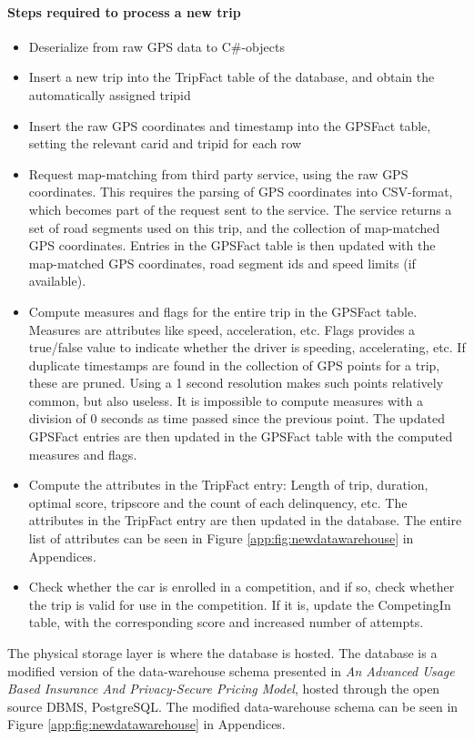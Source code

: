 \paragraph{Steps required to process a new trip}
\begin{itemize}
\item Deserialize from raw GPS data to C\#-objects
\item Insert a new trip into the TripFact table of the database, and obtain the automatically assigned tripid
\item Insert the raw GPS coordinates and timestamp into the GPSFact table, setting the relevant carid and tripid for each row
\item Request map-matching from third party service, using the raw GPS coordinates\cite{trackmatch}. This requires the parsing of GPS coordinates into CSV-format, which becomes part of the request sent to the service. The service returns a set of road segments used on this trip, and the collection of map-matched GPS coordinates. Entries in the GPSFact table is then updated with the map-matched GPS coordinates, road segment ids and speed limits (if available).
\item Compute measures and flags for the entire trip in the GPSFact table. Measures are attributes like speed, acceleration, etc. Flags provides a true/false value to indicate whether the driver is speeding,  accelerating, etc. If duplicate timestamps are found in the collection of GPS points for a trip, these are pruned. Using a 1 second resolution makes such points relatively common, but also useless. It is impossible to compute measures with a division of 0 seconds as time passed since the previous point. The updated GPSFact entries are then updated in the GPSFact table with the computed measures and flags.
\item Compute the attributes in the TripFact entry: Length of trip, duration, optimal score, tripscore and the count of each delinquency, etc. The attributes in the TripFact entry are then updated in the database. The entire list of attributes can be seen in Figure \ref{app:fig:newdatawarehouse} in Appendices.
\item Check whether the car is enrolled in a competition, and if so, check whether the trip is valid for use in the competition. If it is, update the CompetingIn table, with the corresponding score and increased number of attempts. 
\end{itemize}

The physical storage layer is where the database is hosted. The database is a modified version of the data-warehouse schema presented in \textit{An Advanced Usage Based Insurance And Privacy-Secure Pricing Model}\cite{sw9_report}, hosted through the open source DBMS, PostgreSQL\cite{postgresql}. The modified data-warehouse schema can be seen in Figure \ref{app:fig:newdatawarehouse} in Appendices.